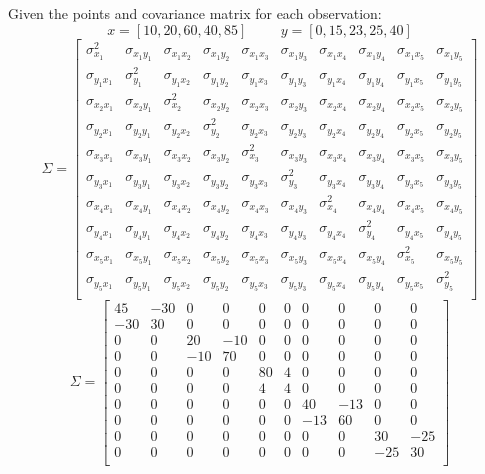 Given the points and covariance matrix for each observation: 
\[
x = [10,20,60,40,85] \hspace{1cm} y = [0,15,23,25,40]
\]
\[
\Sigma = 
\begin{bmatrix}
\sigma_{x_1}^2 & \sigma_{x_1y_1} & \sigma_{x_1x_2} & \sigma_{x_1y_2} & \sigma_{x_1x_3} & \sigma_{x_1y_3} & \sigma_{x_1x_4} & \sigma_{x_1y_4} & \sigma_{x_1x_5} & \sigma_{x_1y_5} \\
\sigma_{y_1x_1} & \sigma_{y_1}^2 & \sigma_{y_1x_2} & \sigma_{y_1y_2} & \sigma_{y_1x_3} & \sigma_{y_1y_3} & \sigma_{y_1x_4} & \sigma_{y_1y_4} & \sigma_{y_1x_5} & \sigma_{y_1y_5} \\
\sigma_{x_2x_1} & \sigma_{x_2y_1} & \sigma_{x_2}^2 & \sigma_{x_2y_2} & \sigma_{x_2x_3} & \sigma_{x_2y_3} & \sigma_{x_2x_4} & \sigma_{x_2y_4} & \sigma_{x_2x_5} & \sigma_{x_2y_5} \\
\sigma_{y_2x_1} & \sigma_{y_2y_1} & \sigma_{y_2x_2} & \sigma_{y_2}^2 & \sigma_{y_2x_3} & \sigma_{y_2y_3} & \sigma_{y_2x_4} & \sigma_{y_2y_4} & \sigma_{y_2x_5} & \sigma_{y_2y_5} \\
\sigma_{x_3x_1} & \sigma_{x_3y_1} & \sigma_{x_3x_2} & \sigma_{x_3y_2} & \sigma_{x_3}^2 & \sigma_{x_3y_3} & \sigma_{x_3x_4} & \sigma_{x_3y_4} & \sigma_{x_3x_5} & \sigma_{x_3y_5} \\
\sigma_{y_3x_1} & \sigma_{y_3y_1} & \sigma_{y_3x_2} & \sigma_{y_3y_2} & \sigma_{y_3x_3} & \sigma_{y_3}^2 & \sigma_{y_3x_4} & \sigma_{y_3y_4} & \sigma_{y_3x_5} & \sigma_{y_3y_5} \\
\sigma_{x_4x_1} & \sigma_{x_4y_1} & \sigma_{x_4x_2} & \sigma_{x_4y_2} & \sigma_{x_4x_3} & \sigma_{x_4y_3} & \sigma_{x_4}^2 & \sigma_{x_4y_4} & \sigma_{x_4x_5} & \sigma_{x_4y_5} \\
\sigma_{y_4x_1} & \sigma_{y_4y_1} & \sigma_{y_4x_2} & \sigma_{y_4y_2} & \sigma_{y_4x_3} & \sigma_{y_4y_3} & \sigma_{y_4x_4} & \sigma_{y_4}^2 & \sigma_{y_4x_5} & \sigma_{y_4y_5} \\
\sigma_{x_5x_1} & \sigma_{x_5y_1} & \sigma_{x_5x_2} & \sigma_{x_5y_2} & \sigma_{x_5x_3} & \sigma_{x_5y_3} & \sigma_{x_5x_4} & \sigma_{x_5y_4} & \sigma_{x_5}^2 & \sigma_{x_5y_5} \\
\sigma_{y_5x_1} & \sigma_{y_5y_1} & \sigma_{y_5x_2} & \sigma_{y_5y_2} & \sigma_{y_5x_3} & \sigma_{y_5y_3} & \sigma_{y_5x_4} & \sigma_{y_5y_4} & \sigma_{y_5x_5} & \sigma_{y_5}^2 \\
\end{bmatrix}
\]
\[
\Sigma = 
 \begin{bmatrix}
 45&-30&0&0&0&0&0&0&0&0\\
 -30&30&0&0&0&0&0&0&0&0\\
 0&0&20&-10&0&0&0&0&0&0\\
 0&0&-10&70&0&0&0&0&0&0\\
 0&0&0&0&80&4&0&0&0&0\\
 0&0&0&0&4&4&0&0&0&0\\
 0&0&0&0&0&0&40&-13&0&0\\
 0&0&0&0&0&0&-13&60&0&0\\
 0&0&0&0&0&0&0&0&30&-25\\
 0&0&0&0&0&0&0&0&-25&30\\
 \end{bmatrix}
\]
